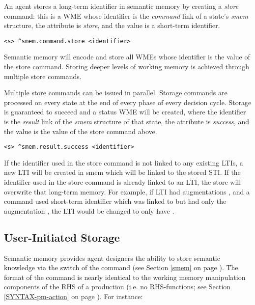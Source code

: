 An agent stores a long-term identifier in semantic memory by creating a \emph{store} command: this is a WME whose identifier is the \emph{command} link of a state's \emph{smem} structure, the attribute is \emph{store}, and the value is a short-term identifier.

\begin{verbatim}
<s> ^smem.command.store <identifier>
\end{verbatim}

Semantic memory will encode and store all WMEs whose identifier is the value of the store command.  
Storing deeper levels of working memory is achieved through multiple store commands.

Multiple store commands can be issued in parallel.  
Storage commands are processed on every state at the end of every phase of every decision cycle.  
Storage is guaranteed to succeed and a status WME will be created, where the identifier is the \emph{result} link of the \emph{smem} structure of that state, the attribute is \emph{success}, and the value is the value of the store command above.

\begin{verbatim}
<s> ^smem.result.success <identifier>
\end{verbatim}

If the identifier used in the store command is not linked to any existing LTIs, a new LTI will be created in smem which will be linked to the stored STI. If the identifier used in the store command is already linked to an LTI, the store will overwrite that long-term memory.
For example, if LTI  had augmentations , and a  command used short-term identifier  which was linked to  but had only the augmentation , the LTI  would be changed to only have .

\subsection{User-Initiated Storage}
Semantic memory provides agent designers the ability to store semantic knowledge via the  switch of the  command (see Section \ref{smem} on page \pageref{smem}).  
The format of the command is nearly identical to the working memory manipulation components of the RHS of a production (i.e. no RHS-functions; see Section \ref{SYNTAX-pm-action} on page \pageref{SYNTAX-pm-action}).  
For instance:

